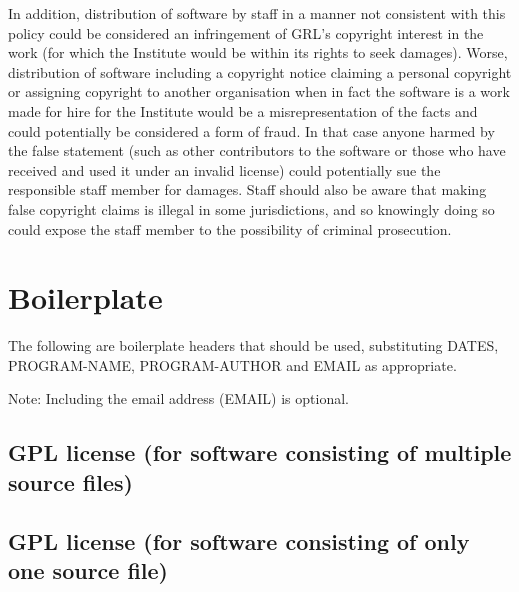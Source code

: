 \documentclass[10pt,a4paper]{article}
\begin{document}
\par In addition, distribution of software by staff in a manner not consistent with 
this policy could be considered an infringement of GRL's copyright interest in the 
work (for which the Institute would be within its rights to seek damages). Worse, 
distribution of software including a copyright notice claiming a personal copyright 
or assigning copyright to another organisation when in fact the software is a work 
made for hire for the Institute would be a misrepresentation of the facts and could 
potentially be considered a form of fraud. In that case anyone harmed by the false  
statement (such as other contributors to the software or those who have received 
and used it under an invalid license) could potentially sue the responsible staff 
member for damages. Staff should also be aware that making false copyright 
claims is illegal in some jurisdictions, and so knowingly doing so could expose 
the staff member to the possibility of criminal prosecution. 




\appendix

\section{Boilerplate}
\label{appendix:boilerplate}

The following are boilerplate headers that should be used, substituting 
DATES, PROGRAM-NAME, PROGRAM-AUTHOR and EMAIL as appropriate.

Note: Including the email address (EMAIL) is optional. 

\subsection{GPL license (for software consisting of multiple source files)}

\begin{boilerplate}

\end{boilerplate}

\subsection{GPL license (for software consisting of only one source file)}
\begin{boilerplate}

\end{boilerplate}
\end{document}
